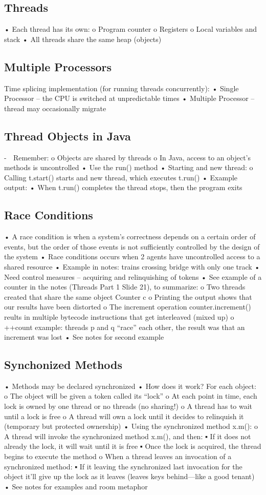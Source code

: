 \documentclass[11pt]{article}
\begin{document}
\subsection{Threads}
• Each thread has its own:
o Program counter
o Registers
o Local variables and stack
• All threads share the same heap (objects)
\subsection{Multiple Processors}
Time splicing implementation (for running threads concurrently):
• Single Processor – the CPU is switched at unpredictable times
• Multiple Processor – thread may occasionally migrate
\subsection{Thread Objects in Java}
-  Remember:
o Objects are shared by threads
o In Java, access to an object’s methods is uncontrolled
• Use the run() method
• Starting and new thread:
o Calling t.start() starts and new thread, which executes t.run()
• Example output:
• When t.run() completes the thread stops, then the program exits
\subsection{Race Conditions}
• A race condition is when a system’s correctness depends on a certain order of events, but the
order of those events is not sufficiently controlled by the design of the system
• Race conditions occurs when 2 agents have uncontrolled access to a shared resource
• Example in notes: trains crossing bridge with only one track
• Need control measures – acquiring and relinquishing of tokens
• See example of a counter in the notes (Threads Part 1 Slide 21), to summarize:
o Two threads created that share the same object Counter c
o Printing the output shows that our results have been distorted
o The increment operation counter.increment() reults in multiple bytecode instructions that
get interleaved (mixed up)
o ++count example: threads p and q “race” each other, the result was that an increment was
lost
• See notes for second example
\subsection{Synchonized Methods}
• Methods may be declared synchronized
• How does it work? For each object:
o The object will be given a token called its “lock”
o At each point in time, each lock is owned by one thread or no threads (no sharing!)
o A thread has to wait until a lock is free
o A thread will own a lock until it decides to relinquish it (temporary but protected ownership)
• Using the synchronized method x.m():
o A thread will invoke the synchronized method x.m(), and then:
▪ If it does not already the lock, it will wait until it is free
▪ Once the lock is acquired, the thread begins to execute the method
o When a thread leaves an invocation of a synchronized method:
▪ If it leaving the synchronized last invocation for the object it’ll give up the lock as it
leaves (leaves keys behind—like a good tenant)
• See notes for examples and room metaphor
\end{document}
